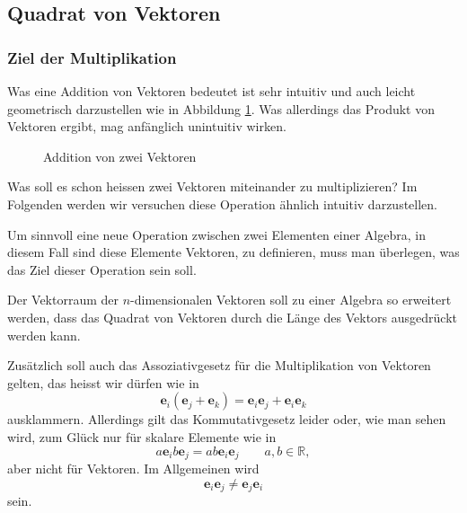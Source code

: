 \subsection{Quadrat von Vektoren}
\subsubsection{Ziel der Multiplikation}
%
Was eine Addition von Vektoren bedeutet ist sehr intuitiv und auch leicht geometrisch darzustellen wie in Abbildung \ref{figure:addition}. Was allerdings das Produkt von Vektoren ergibt, mag anfänglich unintuitiv wirken.
\begin{figure}[tb]
	\centering
		\caption{Addition von zwei Vektoren\label{figure:addition}}
\end{figure}
Was soll es schon heissen zwei Vektoren miteinander zu multiplizieren? 
Im Folgenden werden wir versuchen diese Operation ähnlich intuitiv darzustellen.

Um sinnvoll eine neue Operation zwischen zwei Elementen einer Algebra, in diesem Fall sind diese Elemente Vektoren, zu definieren, muss man überlegen, was das Ziel dieser Operation sein soll.
 
\begin{ziel}
	\label{clifford:ziel}
	Der Vektorraum der $n$-dimensionalen Vektoren soll zu einer Algebra so erweitert werden, dass das Quadrat von Vektoren durch die Länge des Vektors ausgedrückt werden kann.
\end{ziel}
Zusätzlich soll auch das Assoziativgesetz für die Multiplikation von Vektoren gelten, das heisst wir dürfen wie in
%
\begin{equation*}
    \label{eq:assoziativ}
    \textbf{e}_i(\textbf{e}_j + \textbf{e}_k) 
    = 
    \textbf{e}_i\textbf{e}_j + \textbf{e}_i\textbf{e}_k
\end{equation*}
ausklammern.
Allerdings gilt das Kommutativgesetz leider oder, wie man sehen wird, zum Glück nur für skalare Elemente wie in
%
\begin{equation}
    \label{eq:kommSkalar}
    a\textbf{e}_ib\textbf{e}_j 
    = 
    ab\textbf{e}_i\textbf{e}_j \qquad a,b \in \mathbb{R},
\end{equation}
aber nicht für Vektoren. Im Allgemeinen wird
\begin{equation}
    \label{eq:kommVector}
    \textbf{e}_i\textbf{e}_j 
    \neq 
    \textbf{e}_j\textbf{e}_i
\end{equation}
sein.
